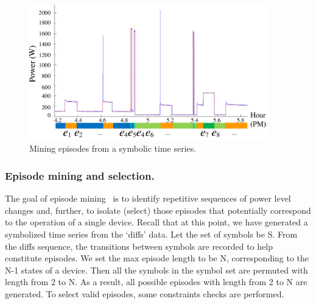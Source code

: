 \begin{figure}[!hbtp]
\centering
\includegraphics[width=0.93\textwidth]{disaggfigs/steadyevents.pdf}
\caption{Mining episodes from a symbolic time series.}
\label{fig_tevents}
\end{figure}

\subsubsection*{Episode mining and selection.} The goal of episode mining~\cite{motifgoal}
is to identify repetitive sequences of power level changes and, further, to
isolate (select) those episodes that potentially correspond to the operation
of a single device. Recall that at this point, we have generated a
symbolized time series from the `diffs' data. Let the set of symbols be S.
From the diffs sequence, the transitions between
symbols are recorded to help constitute episodes. We set the max
episode length to be N, corresponding to the N-1 states of a device. Then all
the symbols in the symbol set are permuted with length from 2 to N. As a
result, all possible episodes with length from 2 to N are generated. To select
valid episodes, some constraints checks are performed.

